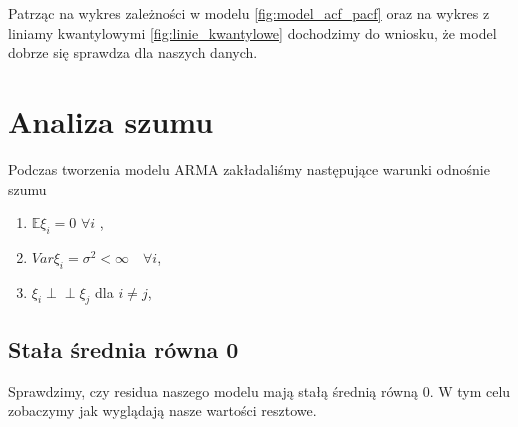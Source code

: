 \documentclass[12pt]{article}
\theoremstyle{exer}
\begin{document}
Patrząc na wykres zależności w modelu \ref{fig:model_acf_pacf} oraz na wykres z liniamy kwantylowymi \ref{fig:linie_kwantylowe} dochodzimy do wniosku, że model dobrze się sprawdza dla naszych danych.


	\section{Analiza szumu}
	Podczas tworzenia modelu ARMA zakładaliśmy następujące warunki odnośnie szumu
	\begin{enumerate}
		\item $\mathbb{E}\xi_i=0$ $\forall i$ ,
		\item $Var\xi_i=\sigma^2<\infty\quad\forall i$,
		\item $\xi_i\perp\!\!\!\perp\xi_j$ dla $i\neq j$,
	\end{enumerate}
	
	\subsection{Stała średnia równa 0}
	Sprawdzimy, czy residua naszego modelu mają stałą średnią równą $0$. W tym celu zobaczymy jak wyglądają nasze wartości resztowe.
	
\end{document}
